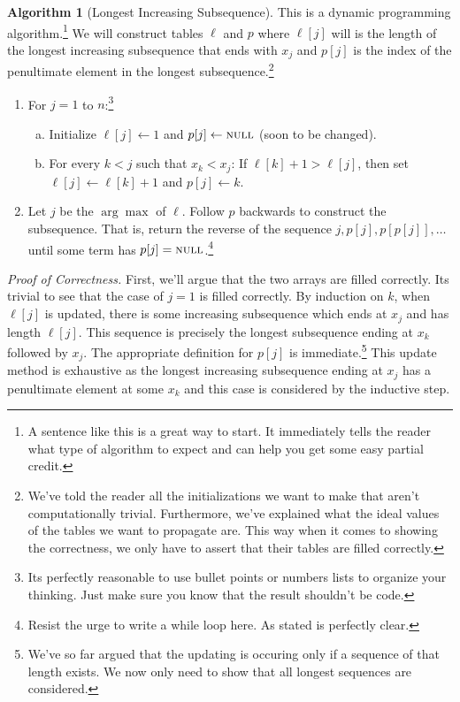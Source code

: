 \documentclass[11pt]{article}
\theoremstyle{plain}
\theoremstyle{definition}
\newtheorem{alg}[thm]{Algorithm}
\newcommand{\short}[1]{\mbox{\sc #1}}
\newcommand{\nil}{\short{null}}
\numberwithin{equation}{section}
\numberwithin{figure}{section}
\begin{document}
\begin{alg}[Longest Increasing Subsequence] This is a dynamic programming algorithm.\footnote{A sentence like this is a great way to start. It immediately tells the reader what type of algorithm to expect and can help you get some easy partial credit.} We will construct tables $\ell$ and $p$ where $\ell[j]$ will is the length of the longest increasing subsequence that ends with $x_j$ and $p[j]$ is the index of the penultimate element in the longest subsequence.\footnote{We've told the reader all the initializations we want to make that aren't computationally trivial. Furthermore, we've explained what the ideal values of the tables we want to propagate are. This way when it comes to showing the correctness, we only have to assert that their tables are filled correctly.} 

\begin{enumerate}
\item For $j = 1$ to $n$:\footnote{Its perfectly reasonable to use bullet points or numbers lists to organize your thinking. Just make sure you know that the result shouldn't be code.}
\begin{enumerate}[(a)]
\item Initialize $\ell[j] \leftarrow 1$ and $p[j] \leftarrow \nil$ (soon to be changed).
\item For every $k < j$ such that $x_k < x_j$: If $\ell[k] + 1 > \ell[j]$, then set $\ell[j] \leftarrow \ell[k] + 1$ and $p[j] \leftarrow k$.
\end{enumerate}
\item Let $j$ be the $\arg \max$ of $\ell$. Follow $p$ backwards to construct the subsequence. That is, return the reverse of the sequence $j, p[j], p[p[j]], \ldots$ until some term has $p[j] = \nil$.\footnote{Resist the urge to write a while loop here. As stated is perfectly clear.}
\end{enumerate}

\noindent \textit{Proof of Correctness.} First, we'll argue that the two arrays are filled correctly. Its trivial to see that the case of $j = 1$ is filled correctly. By induction on $k$, when $\ell[j]$ is updated, there is some increasing subsequence which ends at $x_j$ and has length $\ell[j]$. This sequence is precisely the longest subsequence ending at $x_k$ followed by $x_j$. The appropriate definition for $p[j]$ is immediate.\footnote{We've so far argued that the updating is occuring only if a sequence of that length exists. We now only need to show that all longest sequences are considered.} This update method is exhaustive as the longest increasing subsequence ending at $x_j$ has a penultimate element at some $x_k$ and this case is considered by the inductive step. \\


\end{alg}
\end{document}
